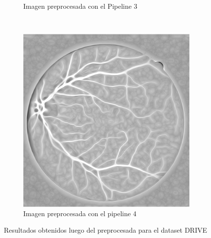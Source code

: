 \begin{figure} [H]
\begin{subfigure}[b]{0.3\textwidth}
        \caption{Imagen preprocesada con el Pipeline 3}
        \label{fig:tiger}
    \end{subfigure}
    ~ %
    \begin{subfigure}[b]{0.3\textwidth}
        \includegraphics[width=\textwidth]{Figures/DRIVE/DRIVE_Pip4_21_training_cropped}
        \caption{Imagen preprocesada con el pipeline 4}
        \label{fig:mouse}
    \end{subfigure}
    \caption{Resultados obtenidos luego del preprocesada para el dataset DRIVE}\label{fig:animals}
\end{figure}

